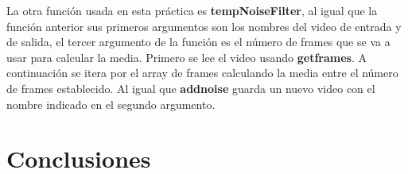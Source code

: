 \documentclass[a4paper,12pt]{report}
\begin{document}
La otra función usada en esta práctica es \textbf{tempNoiseFilter}, al igual que la función anterior sus primeros argumentos son los nombres del video de entrada y de salida, el tercer argumento de la función es el número de frames que se va a usar para calcular la media. Primero se lee el video usando \textbf{getframes}. A continuación se itera por el array de frames calculando la media entre el número de frames establecido. Al igual que \textbf{addnoise} guarda un nuevo video con el nombre indicado en el segundo argumento.\\
\chapter{Conclusiones}

\nocite{*}
\printbibliography[heading=bibintoc,title={Bibliography}]
\end{document}
